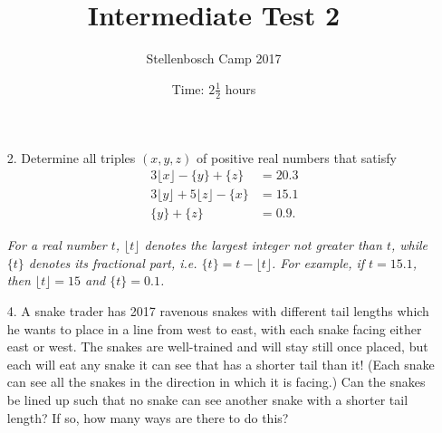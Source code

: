 \documentclass{article}
\title{Intermediate Test 2}
\author{Stellenbosch Camp 2017}
\date{Time: $2\frac{1}{2}$ hours}
\begin{document}
 \maketitle

\begin{enumerate}

\item[2.] %
Determine all triples $(x,y,z)$ of positive real numbers that satisfy
\begin{align*}
	3\lfloor{x}\rfloor -\{y\} +\{z\} &= 20.3 \\
	3\lfloor{y}\rfloor +5\lfloor{z}\rfloor -\{x\} &= 15.1 \\
	\{y\} +\{z\} &= 0.9.
\end{align*}

\emph{For a real number $t$, $\lfloor{t}\rfloor$ denotes the largest integer not greater than $t$, while $\{t\}$ denotes its fractional part, i.e. $\{t\} = t -\lfloor{t}\rfloor$. For example, if $t = 15.1$, then $\lfloor{t}\rfloor = 15$ and $\{t\} = 0.1$.}

\item[4.] %
A snake trader has 2017 ravenous snakes with different tail lengths which he wants to place in a line from west to east, with each snake facing either east or west. The snakes are well-trained and will stay still once placed, but each will eat any snake it can see that has a shorter tail than it! (Each snake can see all the snakes in the direction in which it is facing.) Can the snakes be lined up such that no snake can see another snake with a shorter tail length? If so, how many ways are there to do this?

\end{enumerate}
\end{document}
